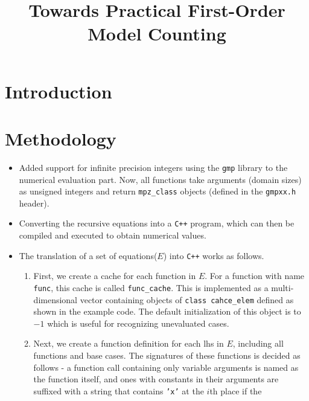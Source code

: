 \documentclass{article}
\title{Towards Practical First-Order Model Counting}
\begin{document}
\maketitle

\begin{abstract}
\end{abstract}

\section{Introduction}

\section{Methodology}

\begin{itemize}
  \item Added support for infinite precision integers using the \texttt{gmp}
        library to the numerical evaluation part. Now, all functions take
        arguments (domain sizes) as unsigned integers and return
        \texttt{mpz\_class} objects (defined in the \texttt{gmpxx.h} header).
  \item Converting the recursive equations into a \texttt{C++} program, which
        can then be compiled and executed to obtain numerical values.
  \item The translation of a set of equations($E$) into \texttt{C++} works as
        follows.
        \begin{enumerate}
          \item First, we create a cache for each function in $E$. For a
                function with name \texttt{func}, this cache is called
                \texttt{func\_cache}. This is implemented as a multi-dimensional
                vector containing objects of \texttt{class cahce\_elem} defined
                as shown in the example code. The default initialization of this
                object is to $-1$ which is useful for recognizing unevaluated
                cases.
          \item Next, we create a function definition for each lhs in $E$,
                including all functions and base cases. The signatures of these
                functions is decided as follows - a function call containing
                only variable arguments is named as the function itself, and
                ones with constants in their arguments are suffixed with a
                string that contains \texttt{'x'} at the $i$th place if the

\end{enumerate}
\end{itemize}
\end{document}
